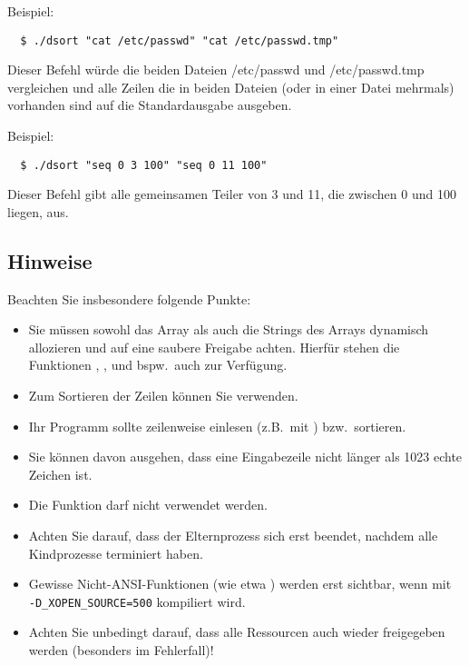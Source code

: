 Beispiel:
\begin{verbatim}
  $ ./dsort "cat /etc/passwd" "cat /etc/passwd.tmp"
\end{verbatim}

Dieser Befehl würde die beiden Dateien /etc/passwd und /etc/passwd.tmp
vergleichen und alle Zeilen die in beiden Dateien (oder in einer Datei
mehrmals) vorhanden sind auf die Standardausgabe ausgeben.

Beispiel:
\begin{verbatim}
  $ ./dsort "seq 0 3 100" "seq 0 11 100"
\end{verbatim}

Dieser Befehl gibt alle gemeinsamen Teiler von 3 und 11, die zwischen
0 und 100 liegen, aus.

\subsection*{Hinweise}

Beachten Sie insbesondere folgende Punkte:

\begin{itemize}
\item Sie müssen sowohl das Array als auch die Strings des Arrays
dynamisch allozieren und auf eine saubere Freigabe achten. Hierfür
stehen die Funktionen , ,
 und bspw.\ auch  zur Verfügung.
\item Zum Sortieren der Zeilen können Sie  verwenden.
\item Ihr Programm sollte zeilenweise einlesen (z.B.\ mit
) bzw.\ sortieren.
\item Sie können davon ausgehen, dass eine Eingabezeile nicht länger
als 1023 echte Zeichen ist.
\item Die Funktion  darf nicht verwendet werden.
\item Achten Sie darauf, dass der Elternprozess sich erst beendet,
nachdem alle Kindprozesse terminiert haben.
\item Gewisse Nicht-ANSI-Funktionen (wie etwa ) werden
erst sichtbar, wenn mit\\
\verb,-D_XOPEN_SOURCE=500, kompiliert wird.
\item Achten Sie unbedingt darauf, dass alle Ressourcen auch wieder
freigegeben werden (besonders im Fehlerfall)!
\end{itemize}

\osueguidelinestwo


